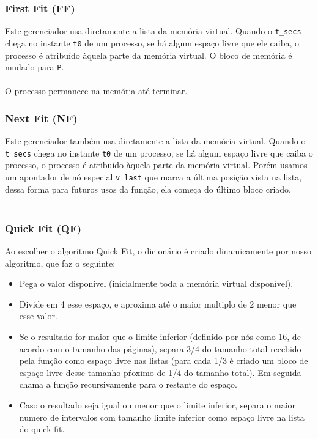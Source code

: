 \documentclass{beamer}
\begin{document}

\begin{frame}
  \frametitle{First Fit (FF)}
  Este gerenciador usa diretamente a lista da memória virtual. Quando o \texttt{t\_secs} chega no instante \texttt{t0} de um processo, se há algum espaço livre que ele caiba, o processo é atribuído àquela parte da memória virtual.
  O bloco de memória é mudado para \texttt{P}. \\~\\

  O processo permanece na memória até terminar.
\end{frame}


\begin{frame}
  \frametitle{Next Fit (NF)}
  Este gerenciador também usa diretamente a lista da memória virtual. Quando o \texttt{t\_secs} chega no instante \texttt{t0} de um processo, se há algum espaço livre que caiba o processo, o processo é atribuído àquela parte da memória virtual. Porém usamos um apontador de nó especial \texttt{v\_last} que marca a última posição vista na lista, dessa forma para futuros usos da função, ela começa do último bloco criado. \\~\\

\end{frame}

\begin{frame}
  \frametitle{Quick Fit (QF)}
  Ao escolher o algoritmo Quick Fit, o dicionário é criado dinamicamente por nosso algoritmo, que faz o seguinte:
  \begin{itemize}
    \item Pega o valor disponível (inicialmente toda a memória virtual disponível).
    \item Divide em 4 esse espaço, e aproxima até o maior multiplo de 2 menor que esse valor.
    \item Se o resultado for maior que o limite inferior (definido por nós como 16, de acordo com o tamanho das páginas), separa 3/4 do tamanho total recebido pela função como espaço livre nas listas (para cada 1/3 é criado um bloco de espaço livre desse tamanho pŕoximo de 1/4 do tamanho total). Em seguida chama a função recursivamente para o restante do espaço.
    \item Caso o resultado seja igual ou menor que o limite inferior, separa o maior numero de intervalos com tamanho limite inferior como espaço livre na lista do quick fit.
  \end{itemize}
\end{frame}
\end{document}
